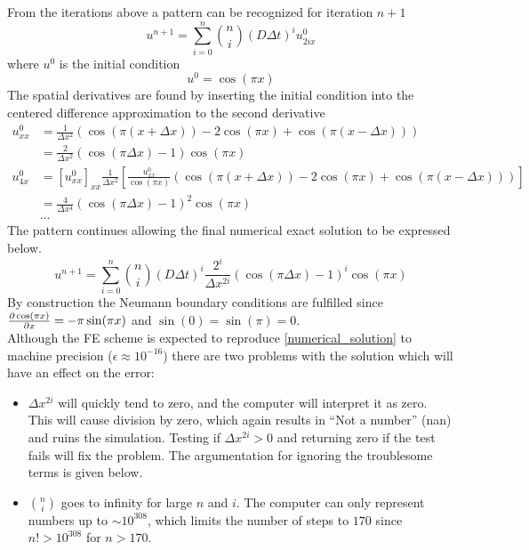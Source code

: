 \noindent From the iterations above a pattern can be recognized for iteration $n+1$\\
\begin{equation}
 u^{n+1} = \sum\limits_{i=0}^n {n\choose i}\left(D\Delta t\right)^iu^0_{2ix}
\end{equation}
where $u^0$ is the initial condition
\begin{equation}
 u^0 = \cos(\pi x)
\end{equation}
The spatial derivatives are found by inserting the initial condition into the centered difference approximation to the second derivative 
\begin{align*}
 u^0_{xx} &= \frac{1}{\Delta x^2}\left(\cos(\pi(x+\Delta x)) -2\cos(\pi x) +\cos(\pi(x-\Delta x))\right) \\
 &= \frac{2}{\Delta x^2}\left(\cos(\pi\Delta x)-1\right)\cos(\pi x)\\
 u^0_{4x} &= [u^0_{xx}]_{xx} \frac{1}{\Delta x^2}\left[\frac{u^0_{xx}}{\cos(\pi x)}\left(\cos(\pi(x+\Delta x)) -2\cos(\pi x) +\cos(\pi(x-\Delta x))\right)\right]\\
 &= \frac{4}{\Delta x^4}\left(\cos(\pi\Delta x)-1\right)^2\cos(\pi x)\\
 &\dots
\end{align*}
The pattern continues allowing the final numerical exact solution to be expressed below.
\begin{equation}\label{numerical_solution}
  u^{n+1} = \sum\limits_{i=0}^n {n\choose i}\left(D\Delta t\right)^i\frac{2^i}{\Delta x^{2i}}\left(\cos(\pi\Delta x)-1\right)^i\cos(\pi x)
\end{equation}
By construction the Neumann boundary conditions are fulfilled since $\frac{\partial \cos(\pi x)}{\partial x} = -\pi\sin(\pi x)$ and $\sin(0) = \sin(\pi) = 0$. \\

Although the FE scheme is expected to reproduce \eqref{numerical_solution} to machine precision ($\epsilon \approx 10^{-16}$) there are two problems with the solution which will have an effect on the error:
\begin{itemize}
 \item $\Delta x^{2i}$ will quickly tend to zero, and the computer will interpret it as zero. This will cause division by zero, which again results in ``Not a number'' (nan) and ruins the simulation. Testing if $\Delta x^{2i}>0$ and returning zero if the test fails will fix the problem. The argumentation for ignoring the troublesome terms is given below.
 \item ${n\choose i}$ goes to infinity for large $n$ and $i$. The computer can only represent numbers up to $\sim10^{308}$, which limits the number of steps to $170$ since $n!>10^{308}$ for $n>170$.
\end{itemize}

